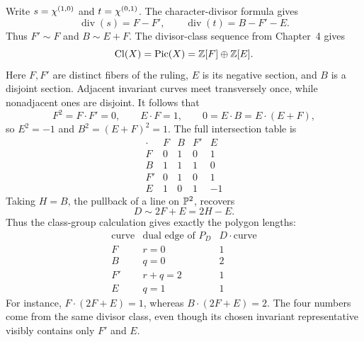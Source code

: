 \begin{example}
\label{ex:classroom-oct19-hirzebruch-classes}
Write \(s=\chi^{(1,0)}\) and \(t=\chi^{(0,1)}\).
The character-divisor formula gives
\[
\operatorname{div}(s)=F-F',\qquad
\operatorname{div}(t)=B-F'-E.
\]
Thus \(F'\sim F\) and \(B\sim E+F\). The divisor-class sequence
from Chapter~4 gives
\[
\operatorname{Cl}(X)=\operatorname{Pic}(X)=\mathbb{Z}[F]\oplus\mathbb{Z}[E].
\]
Here \(F,F'\) are distinct fibers of the ruling, \(E\) is its
negative section, and \(B\) is a disjoint section. Adjacent invariant
curves meet transversely once, while nonadjacent ones are disjoint.
It follows that
\[
F^2=F\cdot F'=0,\qquad E\cdot F=1,\qquad
0=E\cdot B=E\cdot(E+F),
\]
so \(E^2=-1\) and \(B^2=(E+F)^2=1\). The full intersection table is
\[
\begin{array}{c|rrrr}
\cdot&F&B&F'&E\\ \hline
F &0&1&0&1\\
B &1&1&1&0\\
F'&0&1&0&1\\
E &1&0&1&-1
\end{array}
\]
Taking \(H=B\), the pullback of a line on \(\mathbb{P}^2\), recovers
\[
D\sim2F+E=2H-E.
\]
Thus the class-group calculation gives exactly the polygon lengths:
\[
\begin{array}{c|c|c}
\text{curve}&\text{dual edge of }P_D&D\cdot\text{curve}\\ \hline
F &r=0&1\\
B &q=0&2\\
F'&r+q=2&1\\
E &q=1&1
\end{array}
\]
For instance, \(F\cdot(2F+E)=1\), whereas
\(B\cdot(2F+E)=2\). The four numbers come from the same divisor
class, even though its chosen invariant representative visibly
contains only \(F'\) and \(E\).
\end{example}

